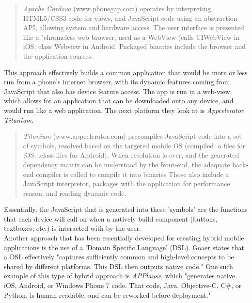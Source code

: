 \documentclass[11pt, twocolumn]{article}
\begin{document}
\begin{quote}
{\it Apache Cordova} (www.phonegap.com) operates by interpreting HTML5/CSS3 code for views, and JavaScript code using an abstraction API, allowing system and hardware access.  The user interface is presented like a "chromeless web browser, used as a WebView (calls UIWebView in iOS, class Webview in Android.  Packaged binaries include the browser and the application sources. ~\cite{Goaer2013}
\end{quote}

This approach effectively builds a common application that would be more or less run from a phone's internet browser, with its dynamic features coming from JavaScript that also has device feature access.  The app is run in a web-view, which allows for an application that can be downloaded onto any device, and would run like a web application.  The next platform they look at is {\it Appcelerator Titanium}.\\

\begin{quote}
{\it Titanium} (www.appcelerator.com) precompiles JavaScript code into a set of symbols, resolved based on the targeted mobile OS (compiled .o files for iOS, .class files for Android).  When resolution is over, and the generated dependency matrix can be understood by the front-end, the adequate back-end compiler is called to compile it into binaries  Those also include a JavaScript interpretor, packages with the application for performance reason, and reading dynamic code. ~\cite{Goaer2013}
\end{quote}

Essentially, the JavaScript that is generated into these 'symbols' are the functions that each device will call on when a natively build component (buttons, textboxes, etc.) is interacted with by the user. ~\cite{Heitkoetter2013}\\

Another approach that has been essentially developed for creating hybrid mobile applications is the use of a 'Domain Specific Language' (DSL). Goaer states that a DSL effectively "captures sufficiently common and high-level concepts to be shared by different platforms.  This DSL then outputs native code."  One such example of this type of hybrid approach is {\it APPlause}, which "generates native iOS, Android, or Windows Phone 7 code.  That code, Java, Objective-C, C\#, or Python, is human-readable, and can be reworked before deployment." ~\cite{Goaer2013} \\
\end{document}
